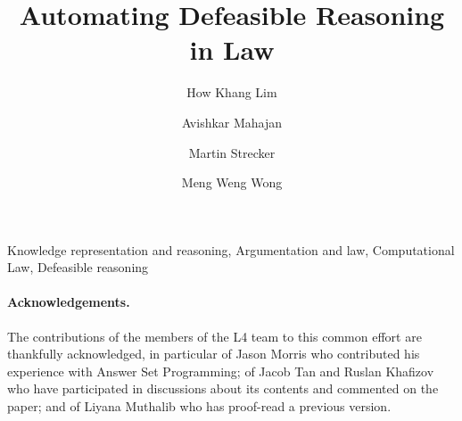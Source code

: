 \documentclass{tlp}
\begin{document}


\title{Automating Defeasible Reasoning in Law}

\begin{authgrp}
\author{How Khang Lim} %
\author{Avishkar Mahajan} %
\author{Martin Strecker} %
\author{Meng Weng Wong} %
\end{authgrp}


\maketitle

\begin{abstract}

\end{abstract}

\begin{keywords}
  Knowledge representation and reasoning,
  Argumentation and law,
  Computational Law,
  Defeasible reasoning
\end{keywords}















\paragraph{Acknowledgements.}
The contributions of the members of the L4 team to this common effort are
thankfully acknowledged, in particular of Jason Morris who contributed his
experience with Answer Set Programming; of Jacob Tan and Ruslan Khafizov who
have participated in discussions about its contents and commented on the
paper; and of Liyana Muthalib who has proof-read a previous version.
\end{document}
